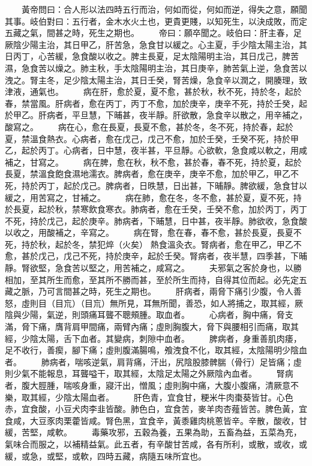 　　黃帝問曰：合人形以法四時五行而治，何如而從，何如而逆，得失之意，願聞其事。岐伯對曰：五行者，金木水火土也，更貴更賤，以知死生，以決成敗，而定五藏之氣，間甚之時，死生之期也。
　　帝曰：願卒聞之。岐伯曰：肝主春，足厥陰少陽主治，其日甲乙，肝苦急，急食甘以緩之。心主夏，手少陰太陽主治，其日丙丁，心苦緩，急食酸以收之。脾主長夏，足太陰陽明主治，其日戊己，脾苦濕，急食苦以燥之。肺主秋，手太陰陽明主治，其日庚辛，肺苦氣上逆，急食苦以洩之。腎主冬，足少陰太陽主治，其日壬癸，腎苦燥，急食辛以潤之，開腠理，致津液，通氣也。
　　病在肝，愈於夏，夏不愈，甚於秋，秋不死，持於冬，起於春，禁當風。肝病者，愈在丙丁，丙丁不愈，加於庚辛，庚辛不死，持於壬癸，起於甲乙。肝病者，平旦慧，下晡甚，夜半靜。肝欲散，急食辛以散之，用辛補之，酸寫之。
　　病在心，愈在長夏，長夏不愈，甚於冬，冬不死，持於春，起於夏，禁溫食熱衣。心病者，愈在戊己，戊己不愈，加於壬癸，壬癸不死，持於甲乙，起於丙丁。心病者，日中慧，夜半甚，平旦靜。心欲軟，急食咸以軟之，用咸補之，甘寫之。
　　病在脾，愈在秋，秋不愈，甚於春，春不死，持於夏，起於長夏，禁溫食飽食濕地濡衣。脾病者，愈在庚辛，庚辛不愈，加於甲乙，甲乙不死，持於丙丁，起於戊己。脾病者，日昳慧，日出甚，下晡靜。脾欲緩，急食甘以緩之，用苦寫之，甘補之。
　　病在肺，愈在冬，冬不愈，甚於夏，夏不死，持於長夏，起於秋，禁寒飲食寒衣。肺病者，愈在壬癸，壬癸不愈，加於丙丁，丙丁不死，持於戊己，起於庚辛。肺病者，下晡慧，日中甚，夜半靜。肺欲收，急食酸以收之，用酸補之，辛寫之。
　　病在腎，愈在春，春不愈，甚於長夏，長夏不死，持於秋，起於冬，禁犯焠（火矣） 熱食溫灸衣。腎病者，愈在甲乙，甲乙不愈，甚於戊己，戊己不死，持於庚辛，起於壬癸。腎病者，夜半慧，四季甚，下晡靜。腎欲堅，急食苦以堅之，用苦補之，咸寫之。
　　夫邪氣之客於身也，以勝相加，至其所生而愈，至其所不勝而甚，至於所生而持，自得其位而起。必先定五藏之脈，乃可言間甚之時，死生之期也。
　　肝病者，兩脅下痛引少腹，令人善怒，虛則目（目巟）（目巟）無所見，耳無所聞，善恐，如人將捕之，取其經，厥陰與少陽，氣逆，則頭痛耳聾不聰頰腫。取血者。
　　心病者，胸中痛，脅支滿，脅下痛，膺背肩甲間痛，兩臂內痛；虛則胸腹大，脅下與腰相引而痛，取其經，少陰太陽，舌下血者。其變病，刺隙中血者。
　　脾病者，身重善肌肉痿，足不收行，善瘈，腳下痛；虛則腹滿腸鳴，飧洩食不化，取其經，太陰陽明少陰血者。
　　肺病者，喘咳逆氣，肩背痛，汗出，尻陰股膝髀腨（骨行）足皆痛；虛則少氣不能報息，耳聾嗌干，取其經，太陰足太陽之外厥陰內血者。
　　腎病者，腹大脛腫，喘咳身重，寢汗出，憎風；虛則胸中痛，大腹小腹痛，清厥意不樂，取其經，少陰太陽血者。
　　肝色青，宜食甘，粳米牛肉棗葵皆甘。心色赤，宜食酸，小豆犬肉李韭皆酸。肺色白，宜食苦，麥羊肉杏薤皆苦。脾色黃，宜食咸，大豆豕肉栗藿皆咸。腎色黑，宜食辛，黃黍雞肉桃蔥皆辛。辛散，酸收，甘緩，苦堅，咸軟。
　　毒藥攻邪，五穀為養，五果為助，五畜為益，五菜為充，氣味合而服之，以補精益氣。此五者，有辛酸甘苦咸，各有所利，或散，或收，或緩，或急，或堅，或軟，四時五藏，病隨五味所宜也。


